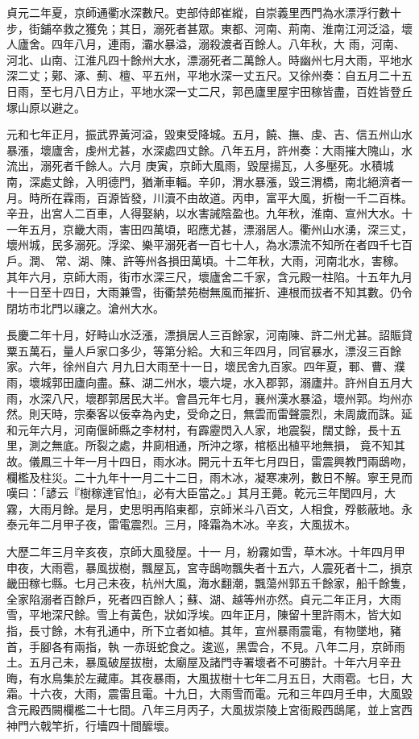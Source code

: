 \begin{pinyinscope}
 貞元二年夏，京師通衢水深數尺。吏部侍郎崔縱，自崇義里西門為水漂浮行數十步，街鋪卒救之獲免；其日，溺死者甚眾。東都、河南、荊南、淮南江河泛溢，壞人廬舍。四年八月，連雨，灞水暴溢，溺殺渡者百餘人。八年秋，大
 雨，河南、河北、山南、江淮凡四十餘州大水，漂溺死者二萬餘人。時幽州七月大雨，平地水深二丈；鄚、涿、薊、檀、平五州，平地水深一丈五尺。又徐州奏：自五月二十五日雨，至七月八日方止，平地水深一丈二尺，郭邑廬里屋宇田稼皆盡，百姓皆登丘塚山原以避之。



 元和七年正月，振武界黃河溢，毀東受降城。五月，饒、撫、虔、吉、信五州山水暴漲，壞廬舍，虔州尤甚，水深處四丈餘。八年五月，許州奏：大雨摧大隗山，水流出，溺死者千餘人。六月
 庚寅，京師大風雨，毀屋揚瓦，人多壓死。水積城南，深處丈餘，入明德門，猶漸車輻。辛卯，渭水暴漲，毀三渭橋，南北絕濟者一月。時所在霖雨，百源皆發，川瀆不由故道。丙申，富平大風，折樹一千二百株。辛丑，出宮人二百車，人得娶納，以水害誡陰盈也。九年秋，淮南、宣州大水。十一年五月，京畿大雨，害田四萬頃，昭應尤甚，漂溺居人。衢州山水湧，深三丈，壞州城，民多溺死。浮梁、樂平溺死者一百七十人，為水漂流不知所在者四千七百戶。潤、
 常、湖、陳、許等州各損田萬頃。十二年秋，大雨，河南北水，害稼。其年六月，京師大雨，街市水深三尺，壞廬舍二千家，含元殿一柱陷。十五年九月十一日至十四日，大雨兼雪，街衢禁苑樹無風而摧折、連根而拔者不知其數。仍令閉坊市北門以禳之。滄州大水。



 長慶二年十月，好畤山水泛漲，漂損居人三百餘家，河南陳、許二州尤甚。詔賑貸粟五萬石，量人戶家口多少，等第分給。大和三年四月，同官暴水，漂沒三百餘家。六年，徐州自六
 月九日大雨至十一日，壞民舍九百家。四年夏，鄆、曹、濮雨，壞城郭田廬向盡。蘇、湖二州水，壞六堤，水入郡郭，溺廬井。許州自五月大雨，水深八尺，壞郡郭居民大半。會昌元年七月，襄州漢水暴溢，壞州郭。均州亦然。則天時，宗秦客以佞幸為內史，受命之日，無雲而雷聲震烈，未周歲而誅。延和元年六月，河南偃師縣之李材村，有霹靂閃入人家，地震裂，闊丈餘，長十五里，測之無底。所裂之處，井廁相通，所沖之塚，棺柩出植平地無損，
 竟不知其故。儀鳳三十年一月十四日，雨水冰。開元十五年七月四日，雷震興教門兩鴟吻，欄檻及柱災。二十九年十一月二十二日，雨木冰，凝寒凍冽，數日不解。寧王見而嘆曰：「諺云『樹稼達官怕』，必有大臣當之。」其月王薨。乾元三年閏四月，大霧，大雨月餘。是月，史思明再陷東都，京師米斗八百文，人相食，殍骸蔽地。永泰元年二月甲子夜，雷電震烈。三月，降霜為木冰。辛亥，大風拔木。



 大歷二年三月辛亥夜，京師大風發屋。十一
 月，紛霧如雪，草木冰。十年四月甲申夜，大雨雹，暴風拔樹，飄屋瓦，宮寺鴟吻飄失者十五六，人震死者十二，損京畿田稼七縣。七月己未夜，杭州大風，海水翻潮，飄蕩州郭五千餘家，船千餘隻，全家陷溺者百餘戶，死者四百餘人；蘇、湖、越等州亦然。貞元二年正月，大雨雪，平地深尺餘。雪上有黃色，狀如浮埃。四年正月，陳留十里許雨木，皆大如指，長寸餘，木有孔通中，所下立者如植。其年，宣州暴雨震電，有物墜地，豬首，手腳各有兩指，執
 一赤斑蛇食之。逡巡，黑雲合，不見。八年二月，京師雨土。五月己未，暴風破屋拔樹，太廟屋及諸門寺署壞者不可勝計。十年六月辛丑晦，有水鳥集於左藏庫。其夜暴雨，大風拔樹十七年二月五日，大雨雹。七日，大霜。十六夜，大雨，震雷且電。十九日，大雨雪而電。元和三年四月壬申，大風毀含元殿西闕欄檻二十七間。八年三月丙子，大風拔崇陵上宮衙殿西鴟尾，並上宮西神門六戟竿折，行墻四十間醿壞。




\end{pinyinscope}
